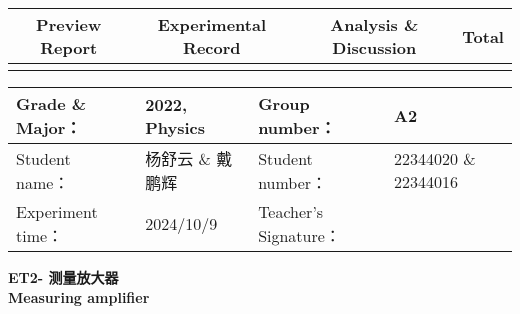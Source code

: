 


\begin{table}
	\renewcommand\arraystretch{1.7}
	\begin{tabularx}{\textwidth}{
			|X|X|X|X
			|X|X|X|X|}
		\hline
		\multicolumn{2}{|c|}{Preview Report}&\multicolumn{2}{|c|}{Experimental Record}&\multicolumn{2}{|c|}{Analysis \& Discussion}&\multicolumn{2}{|c|}{\Large\textbf{Total}}\\
		\hline
		\LARGE & & \LARGE & & \LARGE & & \LARGE & \\
		\hline
	\end{tabularx}
\end{table}


\begin{table}
	\renewcommand\arraystretch{1.7}
	\begin{tabularx}{\textwidth}{|X|X|X|X|}
		\hline
		Grade \& Major： & 2022, Physics &Group number： & A2\\
		\hline
		Student name： & 杨舒云 \& 戴鹏辉  & Student number： & 22344020 \& 22344016\\
		\hline
		Experiment time： & 2024/10/9 & Teacher's Signature： & \\
		\hline
	\end{tabularx}
\end{table}


\begin{center}
	\huge \textbf{ET2- \quad 测量放大器 \\ Measuring amplifier }
\end{center}


